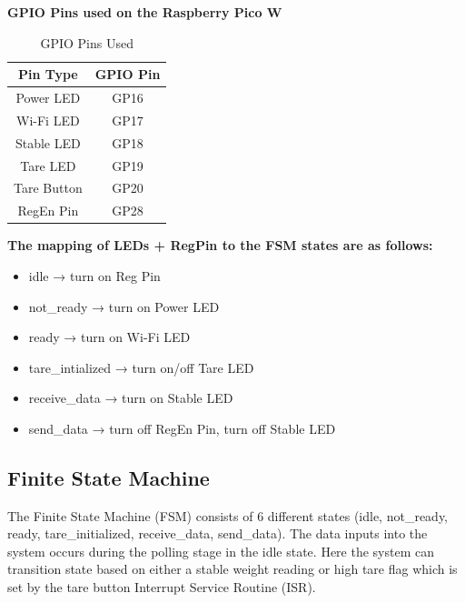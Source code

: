 \begin{center}
    \textbf{GPIO Pins used on the Raspberry Pico W} 
\end{center}
\begin{table}[h]
    \centering
    \begin{tabular}{|c|c|}
        \hline
        Pin Type & GPIO Pin \\
        \hline
        Power LED & GP16 \\
        Wi-Fi LED & GP17 \\
        Stable LED & GP18 \\
        Tare LED & GP19 \\
        Tare Button & GP20 \\
        RegEn Pin & GP28 \\
        \hline
    \end{tabular}
    \caption{GPIO Pins Used}
    \label{tab:gpio_table}
\end{table}

\textbf{The mapping of LEDs + RegPin to the FSM states are as follows:}
\begin{itemize}
    \item idle → turn on Reg Pin
    \item not\_ready → turn on Power LED
    \item ready → turn on Wi-Fi LED
    \item tare\_intialized → turn on/off Tare LED
    \item receive\_data → turn on Stable LED
    \item send\_data → turn off RegEn Pin, turn off Stable LED
\end{itemize}

\subsection{Finite State Machine}
The Finite State Machine (FSM) consists of 6 different states (idle, not\_ready, ready, tare\_initialized, receive\_data, send\_data). The data inputs into the system occurs during the polling stage in the idle state. Here the system can transition state based on either a stable weight reading or high tare flag which is set by the tare button Interrupt Service Routine (ISR).

